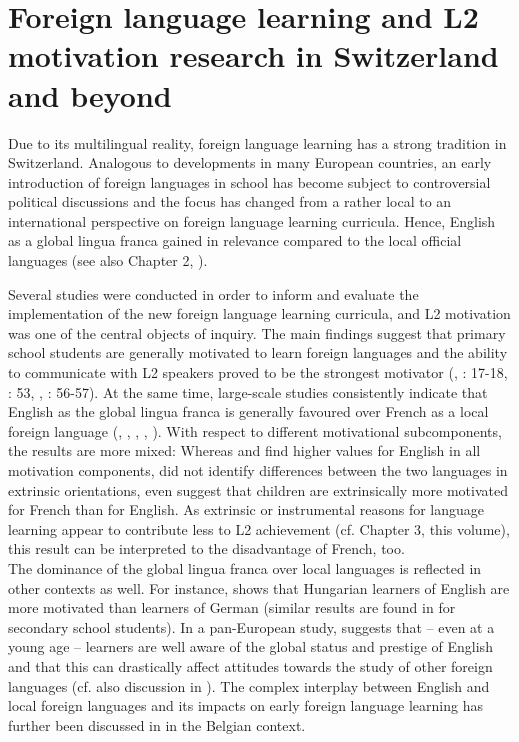 \documentclass[output=paper]{langsci/langscibook}
\begin{document}
\section{Foreign language learning and L2 motivation research in Switzerland and beyond}\label{sec:07:3}

Due to its multilingual reality, foreign language learning has a strong tradition in Switzerland. Analogous to developments in many European countries, an early introduction of foreign languages in school has become subject to controversial political discussions and the focus has changed from a rather local to an international perspective on foreign language learning curricula. Hence, English as a global lingua franca gained in relevance compared to the local official languages (see also Chapter 2, ).

Several studies were conducted in order to inform and evaluate the implementation of the new foreign language learning curricula, and L2 motivation was one of the central objects of inquiry. The main findings suggest that primary school students are generally motivated to learn foreign languages and the ability to communicate with L2 speakers proved to be the strongest motivator (\citealt{BaderSchaer2005}, \citealt{HusfeldtBaderLehmann2009}: 17-18, \citealt{OwEtAl2012}: 53, \citealt{KreisEtAl2014}, \citealt{WiedenkellerLenz2019}: 56-57). At the same time, large-scale studies consistently indicate that English as the global lingua franca is generally favoured over French as a local foreign language (\citealt{Stoeckli2004}, \citealt{Heinzmann2010,Heinzmann2013}, \citealt{PeyerEtAl2016}, \citealt{BruehwilerLePapeRacine2017}, \citealt{PfenningerSingleton2017}). With respect to different motivational subcomponents, the results are more mixed: Whereas \citet[14-15]{Heinzmann2010} and \citet[6-7]{PeyerEtAl2016} find higher values for English in all motivation components, \citet[59-60]{Stoeckli2004} did not identify differences between the two languages in extrinsic orientations, \citet[173]{BruehwilerLePapeRacine2017} even suggest that children are extrinsically more motivated for French than for English. As extrinsic or instrumental reasons for language learning appear to contribute less to L2 achievement (cf. Chapter 3, this volume), this result can be interpreted to the disadvantage of French, too. \\
The dominance of the global lingua franca over local languages is reflected in other contexts as well. For instance, \citet[103--104]{Nikolov2009} shows that Hungarian learners of English are more motivated than learners of German (similar results are found in \citealt{CsizerLukacs2010} for secondary school students). In a pan-European study, \citet{Busse2017} suggests that – even at a young age -- learners are well aware of the global status and prestige of English and that this can drastically affect attitudes towards the study of other foreign languages (cf. also discussion in \citealt{Ushioda2017}). The complex interplay between English and local foreign languages and its impacts on early foreign language learning has further been discussed in \citet{BuylHousen2014} in the Belgian context.
\end{document}
